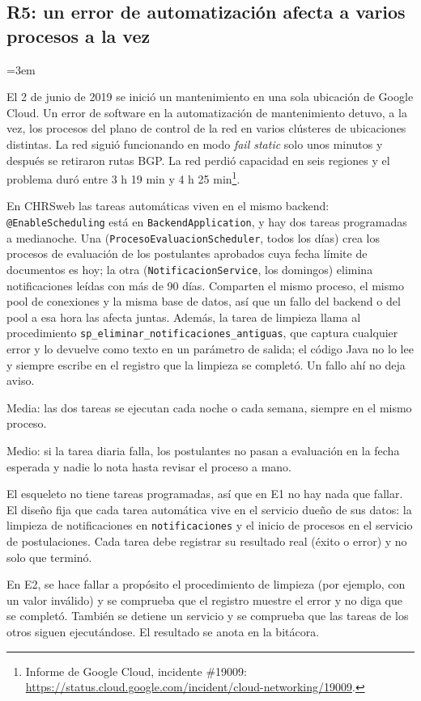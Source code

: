 \subsection{R5: un error de automatización afecta a varios procesos a la vez}
\emergencystretch=3em

\begin{description}[leftmargin=!,labelwidth=4.2cm,style=nextline]
  \item[Incidente de origen]
    El 2 de junio de 2019 se inició un mantenimiento en una sola ubicación de Google Cloud. Un error de software en la automatización de mantenimiento detuvo, a la vez, los procesos del plano de control de la red en varios clústeres de ubicaciones distintas. La red siguió funcionando en modo \emph{fail static} solo unos minutos y después se retiraron rutas BGP. La red perdió capacidad en seis regiones y el problema duró entre 3 h 19 min y 4 h 25 min\footnote{Informe de Google Cloud, incidente \#19009: \url{https://status.cloud.google.com/incident/cloud-networking/19009}.}.
  \item[Relación con el SSDC]
    En CHRSweb las tareas automáticas viven en el mismo backend: \texttt{@EnableScheduling} está en \texttt{BackendApplication}, y hay dos tareas programadas a medianoche. Una (\texttt{ProcesoEvaluacionScheduler}, todos los días) crea los procesos de evaluación de los postulantes aprobados cuya fecha límite de documentos es hoy; la otra (\texttt{NotificacionService}, los domingos) elimina notificaciones leídas con más de 90 días. Comparten el mismo proceso, el mismo pool de conexiones y la misma base de datos, así que un fallo del backend o del pool a esa hora las afecta juntas. Además, la tarea de limpieza llama al procedimiento \texttt{sp\_eliminar\_notificaciones\_antiguas}, que captura cualquier error y lo devuelve como texto en un parámetro de salida; el código Java no lo lee y siempre escribe en el registro que la limpieza se completó. Un fallo ahí no deja aviso.
  \item[Probabilidad]
    Media: las dos tareas se ejecutan cada noche o cada semana, siempre en el mismo proceso.
  \item[Impacto]
    Medio: si la tarea diaria falla, los postulantes no pasan a evaluación en la fecha esperada y nadie lo nota hasta revisar el proceso a mano.
  \item[Medida en E1]
    El esqueleto no tiene tareas programadas, así que en E1 no hay nada que fallar. El diseño fija que cada tarea automática vive en el servicio dueño de sus datos: la limpieza de notificaciones en \texttt{notificaciones} y el inicio de procesos en el servicio de postulaciones. Cada tarea debe registrar su resultado real (éxito o error) y no solo que terminó.
  \item[Verificación]
    En E2, se hace fallar a propósito el procedimiento de limpieza (por ejemplo, con un valor inválido) y se comprueba que el registro muestre el error y no diga que se completó. También se detiene un servicio y se comprueba que las tareas de los otros siguen ejecutándose. El resultado se anota en la bitácora.
\end{description}
